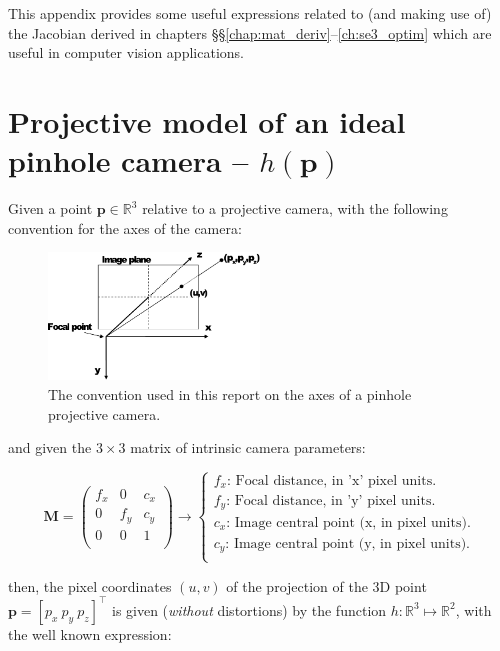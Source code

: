 \documentclass[a4paper,11pt]{report}
\begin{document}
This appendix provides some useful expressions related to (and making use of)
the Jacobian derived in chapters \S\S\ref{chap:mat_deriv}--\ref{ch:se3_optim}
which are useful
in computer vision applications.


\section{Projective model of an ideal pinhole camera -- $h(\mathbf{p})$}

Given a point $\mathbf{p} \in \mathbb{R}^3$ relative to a
projective camera, with the following convention for the axes of the
camera:

\begin{figure}[h!]
\centering
\includegraphics[width=0.50\textwidth]{imgs/pinhole_model.pdf}
\caption{The convention used in this report on the axes of a pinhole projective camera.}
\label{fig:pinhole}
\end{figure}

\noindent and given the $3 \times 3$ matrix of intrinsic camera parameters:

\begin{equation}
\mathbf{M}=
\left(
\begin{array}{ccc}
 f_x & 0 & c_x \\
  0  & f_y & c_y \\
 0 & 0 & 1 \\
\end{array}
\right)
\longrightarrow
\left\{
\begin{array}{l}
 f_x\text{: Focal distance, in 'x' pixel units.} \\
 f_y\text{: Focal distance, in 'y' pixel units.} \\
 c_x\text{: Image central point (x, in pixel units).} \\
 c_y\text{: Image central point (y, in pixel units).} \\
\end{array}
\right.
\end{equation}


\noindent then, the pixel coordinates $(u,v)$ of the projection of the
3D point $\mathbf{p}=[p_x ~ p_y ~ p_z]^\top$
is given (\emph{without} distortions) by the function $h: \mathbb{R}^3 \mapsto \mathbb{R}^2$,
with the well known expression:
\end{document}
